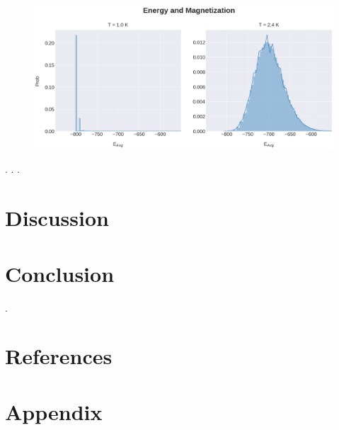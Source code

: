 \documentclass[%
reprint,nofootinbib,
amsmath,amssymb,
aps,
]{revtex4-1}
\begin{document}
\newpage 

\onecolumngrid

\begin{figure}[H]
	\includegraphics[width = \textwidth]{Figures/Plot4E.png} 
	\caption{\centering \label{4C4} \vspace{29mm}}
\end{figure} 

\twocolumngrid

\newpage.
\newpage.
\newpage.
\section{Discussion} \noindent 
\section{Conclusion} \noindent 
\newpage . \newpage
\onecolumngrid 
\section{References} \noindent
\newpage
\section{Appendix} \noindent
\end{document}
